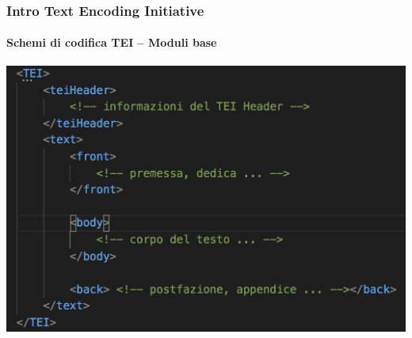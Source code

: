 


\begin{frame}
	\frametitle{Intro Text Encoding Initiative}
	\framesubtitle{Schemi di codifica TEI – Moduli base}
	\addtocounter{nframe}{1}


	\begin{center}
		\includegraphics[width=.95\textwidth]{imgs/esempio3.png}
	\end{center}

    
   

\end{frame}





